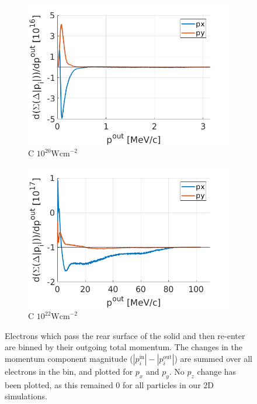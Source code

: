 \documentclass[12pt]{article}
\numberwithin{equation}{section}
\begin{document}
\begin{figure}
\centering
\begin{subfigure}{.49\textwidth}
  \centering
  \includegraphics[width=1\linewidth]{Figures/C_1e20_pi_loss.png}
  \caption{C $10^{20} \text{Wcm}^{-2}$}
\end{subfigure}%
\begin{subfigure}{.49\textwidth}
  \centering
  \includegraphics[width=1\linewidth]{Figures/C_1e22_pi_loss.png}
  \caption{C $10^{22} \text{Wcm}^{-2}$}
\end{subfigure}
\caption{Electrons which pass the rear surface of the solid and then re-enter are binned by their outgoing total momentum. The changes in the momentum component magnitude ($|p_i^\text{in}|-|p_i^\text{out}|$) are summed over all electrons in the bin, and plotted for $p_x$ and $p_y$. No $p_z$ change has been plotted, as this remained 0 for all particles in our 2D simulations. }
\label{fig:tnsa_pi_loss}
\end{figure}
\end{document}
